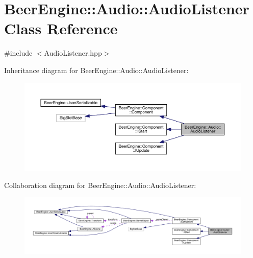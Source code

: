 \hypertarget{class_beer_engine_1_1_audio_1_1_audio_listener}{}\section{Beer\+Engine\+:\+:Audio\+:\+:Audio\+Listener Class Reference}
\label{class_beer_engine_1_1_audio_1_1_audio_listener}


{\ttfamily \#include $<$Audio\+Listener.\+hpp$>$}



Inheritance diagram for Beer\+Engine\+:\+:Audio\+:\+:Audio\+Listener\+:
\nopagebreak
\begin{figure}[H]
\begin{center}
\leavevmode
\includegraphics[width=350pt]{class_beer_engine_1_1_audio_1_1_audio_listener__inherit__graph}
\end{center}
\end{figure}


Collaboration diagram for Beer\+Engine\+:\+:Audio\+:\+:Audio\+Listener\+:
\nopagebreak
\begin{figure}[H]
\begin{center}
\leavevmode
\includegraphics[width=350pt]{class_beer_engine_1_1_audio_1_1_audio_listener__coll__graph}
\end{center}
\end{figure}
